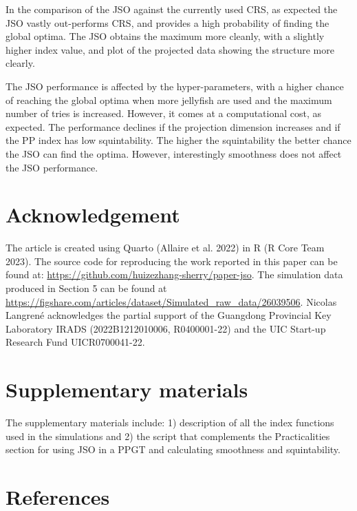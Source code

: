\documentclass[
  12pt,
]{interact}
\theoremstyle{plain}
\begin{document}
In the comparison of the JSO against the currently used CRS, as expected
the JSO vastly out-performs CRS, and provides a high probability of
finding the global optima. The JSO obtains the maximum more cleanly,
with a slightly higher index value, and plot of the projected data
showing the structure more clearly.

The JSO performance is affected by the hyper-parameters, with a higher
chance of reaching the global optima when more jellyfish are used and
the maximum number of tries is increased. However, it comes at a
computational cost, as expected. The performance declines if the
projection dimension increases and if the PP index has low
squintability. The higher the squintability the better chance the JSO
can find the optima. However, interestingly smoothness does not affect
the JSO performance.

\section{Acknowledgement}\label{acknowledgement}

The article is created using Quarto (Allaire et al. 2022) in R (R Core
Team 2023). The source code for reproducing the work reported in this
paper can be found at:
\url{https://github.com/huizezhang-sherry/paper-jso}. The simulation
data produced in Section 5 can be found at
\url{https://figshare.com/articles/dataset/Simulated_raw_data/26039506}.
Nicolas Langrené acknowledges the partial support of the Guangdong
Provincial Key Laboratory IRADS (2022B1212010006, R0400001-22) and the
UIC Start-up Research Fund UICR0700041-22.

\section*{Supplementary materials}\label{supplementary-materials}

The supplementary materials include: 1) description of all the index
functions used in the simulations and 2) the script that complements the
Practicalities section for using JSO in a PPGT and calculating
smoothness and squintability.

\section*{References}\label{references}
\end{document}
